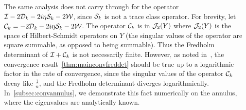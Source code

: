 \begin{remark}
The same analysis does not carry through for the operator
$\mathcal I - 2 {\mathcal D}_{k} - 2i\eta {\mathcal S}_{k} - 2{\mathcal W}$, 
since ${\mathcal S}_{k}$ is not a trace class operator.
For brevity, let $\mathcal C_{k} = -2{\mathcal D}_{k} - 2i\eta {\mathcal S}_{k} - 2{\mathcal W}$.
The operator $\mathcal C_{k}$ is 
in ${\mathcal J}_{2}(Y)$ where
${\mathcal J}_{2}(Y)$ is the space of Hilbert-Schmidt operators
on $Y$ (the singular values of the operator are square
summable, as opposed to being summable).
Thus the Fredholm determinant of $\mathcal I + \mathcal C_{k}$
is not necessarily finite. 
However, as noted in~\cite{zhao2015robust}, the convergence
result~\cref{thm:mainconvfreddet}
should be true up to a logarithmic factor in the rate
of convergence, since the singular values of the operator
$\mathcal C_{k}$ decay like $\frac{1}{n}$, and the
Fredholm determinant diverges logarithmically. 
In~\cref{subsec:convannulus}, we demonstrate this fact
numerically on the annulus, where the eigenvalues are
analytically known. 
\end{remark}
